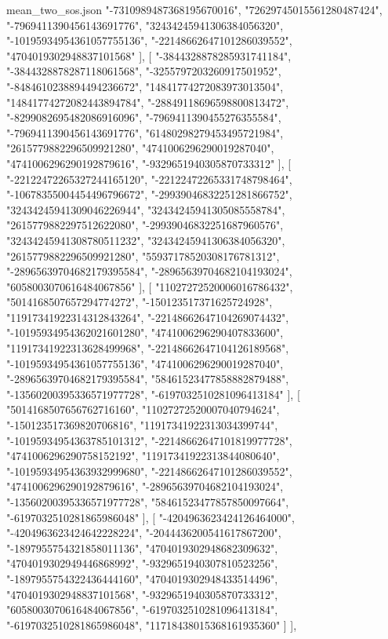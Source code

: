 \begin{filecontents*}[overwrite]{mean_two_sos.json}
    "-7310989487368195670016",
    "72629745015561280487424",
    "-7969411390456143691776",
    "32434245941306384056320",
    "-10195934954361057755136",
    "-22148662647101286039552",
    "4704019302948837101568"
   ],
   [
    "-3844328878285931741184",
    "-3844328878287118061568",
    "-3255797203260917501952",
    "-8484610238894494236672",
    "14841774272083973013504",
    "14841774272082443894784",
    "-28849118696598800813472",
    "-8299082695482086916096",
    "-7969411390455276355584",
    "-7969411390456143691776",
    "61480298279453495721984",
    "2615779882296509921280",
    "4741006296290019287040",
    "4741006296290192879616",
    "-9329651940305870733312"
   ],
   [
    "-22122472265327244165120",
    "-22122472265331748798464",
    "-10678355004454496796672",
    "-29939046832251281866752",
    "32434245941309046226944",
    "32434245941305085558784",
    "2615779882297512622080",
    "-29939046832251687960576",
    "32434245941308780511232",
    "32434245941306384056320",
    "2615779882296509921280",
    "55937178520308176781312",
    "-28965639704682179395584",
    "-28965639704682104193024",
    "6058003070616484067856"
   ],
   [
    "11027272520006016786432",
    "5014168507657294774272",
    "-150123517371625724928",
    "11917341922314312843264",
    "-22148662647104269074432",
    "-10195934954362021601280",
    "4741006296290407833600",
    "11917341922313628499968",
    "-22148662647104126189568",
    "-10195934954361057755136",
    "4741006296290019287040",
    "-28965639704682179395584",
    "58461523477858882879488",
    "-13560200395336571977728",
    "-6197032510281096413184"
   ],
   [
    "5014168507656762716160",
    "11027272520007040794624",
    "-150123517369820706816",
    "11917341922313034399744",
    "-10195934954363785101312",
    "-22148662647101819977728",
    "4741006296290758152192",
    "11917341922313844080640",
    "-10195934954363932999680",
    "-22148662647101286039552",
    "4741006296290192879616",
    "-28965639704682104193024",
    "-13560200395336571977728",
    "58461523477857850097664",
    "-6197032510281865986048"
   ],
   [
    "-4204963623424126464000",
    "-4204963623424642228224",
    "-2044436200541617867200",
    "-1897955754321858011136",
    "4704019302948682309632",
    "4704019302949446868992",
    "-9329651940307810523256",
    "-1897955754322436444160",
    "4704019302948433514496",
    "4704019302948837101568",
    "-9329651940305870733312",
    "6058003070616484067856",
    "-6197032510281096413184",
    "-6197032510281865986048",
    "11718438015368161935360"
   ]
  ],

\end{filecontents*}
